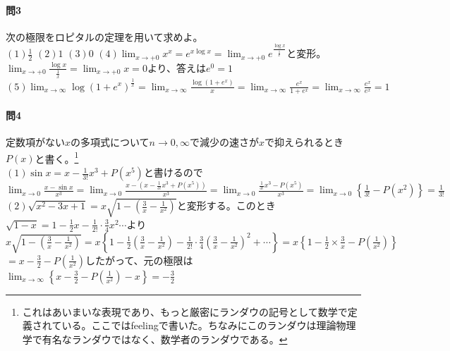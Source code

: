 \documentclass[a4j,dvipdfmx]{jsarticle}
\begin{document}
                \paragraph{問3}次の極限をロピタルの定理を用いて求めよ。\\
                $(1)\frac{1}{2}$\hspace{2mm}
                $(2)1$\hspace{2mm}
                $(3)0$\hspace{2mm}
                $\displaystyle(4)\lim_{x\to+0}x^x=e^{x\log x}=\lim_{x\to+0}e^{\frac{\log x}{\frac{1}{x}}}$と変形。$\displaystyle\lim_{x\to+0}\frac{\log x}{\frac{1}{x}}=\lim_{x\to+0}x=0$より、答えは$e^{0}=1$
                $\displaystyle(5)\lim_{x\to\infty}\log(1+e^x)^{\frac{1}{x}}=\lim_{x\to\infty}\frac{\log(1+e^x)}{x}=\lim_{x\to\infty}\frac{e^x}{1+e^x}=\lim_{x\to\infty}\frac{e^x}{e^x}=1$

                \paragraph{問4}定数項がない$x$の多項式について$n\to0,\infty$で減少の速さが$x$で抑えられるとき$P(x)$と書く。\footnote{これはあいまいな表現であり、もっと厳密にランダウの記号として数学で定義されている。ここではfeelingで書いた。ちなみにこのランダウは理論物理学で有名なランダウではなく、数学者のランダウである。}\\
                \vspace{1mm}$(1)$$\sin x=x-\frac{1}{3!}x^3+P(x^5)$と書けるので\\
                $\displaystyle\lim_{x\to 0}\frac{x-\sin x}{x^3}=\lim_{x\to 0}\frac{x-\left(x-\frac{1}{3!}x^3+P(x^5)\right)}{x^3}=\lim_{x\to 0}\frac{\frac{1}{3!}x^3-P(x^5)}{x^3}=\lim_{x\to 0}\left\{\frac{1}{3!}-P(x^2)\right\}=\frac{1}{3!}$\\
                \vspace{3mm}\noindent
                $(2)\displaystyle\sqrt{x^2-3x+1}=x\sqrt{1-\left(\frac{3}{x}-\frac{1}{x^2}\right)}$と変形する。このとき$\sqrt{1-x}=1-\frac{1}{2}x-\frac{1}{2!}\cdot\frac{3}{4}x^2\cdots$より\\
                $\displaystyle x\sqrt{1-\left(\frac{3}{x}-\frac{1}{x^2}\right)}=x\left\{1-\frac{1}{2}\left(\frac{3}{x}-\frac{1}{x^2}\right)-\frac{1}{2!}\cdot\frac{3}{4}\left(\frac{3}{x}-\frac{1}{x^2}\right)^2+\cdots\right\}=x\left\{1-\frac{1}{2}\times\frac{3}{x}-P\left(\frac{1}{x^2}\right)\right\}$\\
                $\displaystyle=x-\frac{3}{2}-P\left(\frac{1}{x^2}\right)$したがって、元の極限は
                $\displaystyle\lim_{x\to \infty}\left\{x-\frac{3}{2}-P\left(\frac{1}{x^2}\right)-x\right\}=-\frac{3}{2}$
\end{document}
